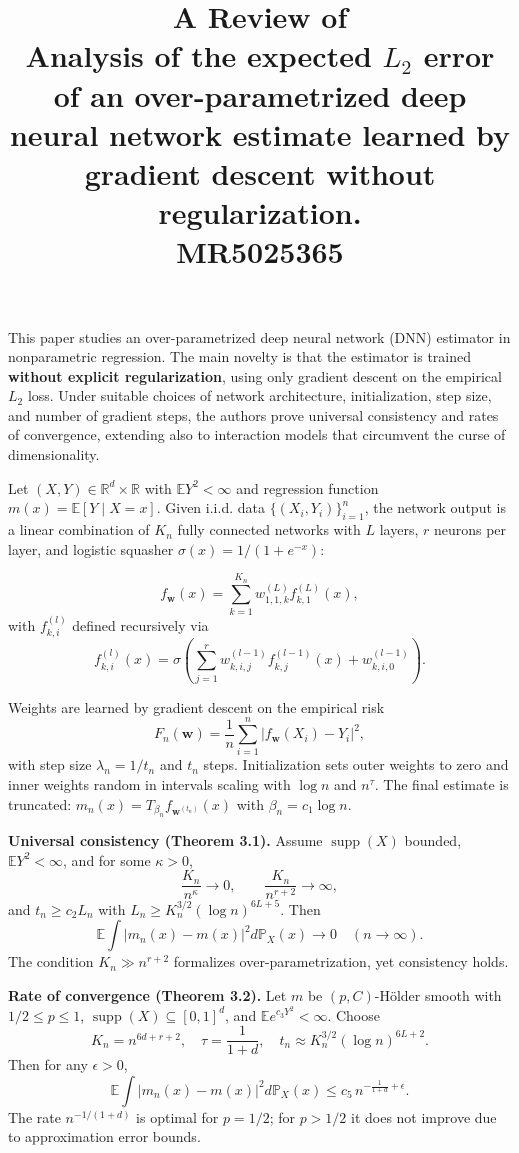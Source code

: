 \documentclass[11pt]{article}
\title{A Review of \\Analysis of the expected $L_{2}$ error of an over-parametrized deep neural network estimate learned by gradient descent without regularization.\\ MR5025365}
\begin{document}
	\maketitle	

\noindent This paper studies an over-parametrized deep neural network (DNN) estimator in nonparametric regression. The main novelty is that the estimator is trained \textbf{without explicit regularization}, using only gradient descent on the empirical $L_{2}$ loss. Under suitable choices of network architecture, initialization, step size, and number of gradient steps, the authors prove universal consistency and rates of convergence, extending also to interaction models that circumvent the curse of dimensionality.

Let $(X,Y)\in\mathbb{R}^d\times\mathbb{R}$ with $\mathbb{E}Y^2<\infty$ and regression function $m(x)=\mathbb{E}[Y\mid X=x]$. Given i.i.d. data $\{(X_i,Y_i)\}_{i=1}^n$, the network output is a linear combination of $K_n$ fully connected networks with $L$ layers, $r$ neurons per layer, and logistic squasher $\sigma(x)=1/(1+e^{-x})$:

$$
f_{\mathbf{w}}(x)=\sum_{k=1}^{K_n} w_{1,1,k}^{(L)} f_{k,1}^{(L)}(x),
$$
with $f_{k,i}^{(l)}$ defined recursively via
$$
f_{k,i}^{(l)}(x)=\sigma\!\left(\sum_{j=1}^r w_{k,i,j}^{(l-1)} f_{k,j}^{(l-1)}(x)+w_{k,i,0}^{(l-1)}\right).
$$

Weights are learned by gradient descent on the empirical risk
$$
F_n(\mathbf{w})=\frac1n\sum_{i=1}^n |f_{\mathbf{w}}(X_i)-Y_i|^2,
$$
with step size $\lambda_n=1/t_n$ and $t_n$ steps. Initialization sets outer weights to zero and inner weights random in intervals scaling with $\log n$ and $n^\tau$. The final estimate is truncated: $m_n(x)=T_{\beta_n}f_{\mathbf{w}^{(t_n)}}(x)$ with $\beta_n=c_1\log n$.

\medskip
\noindent \textbf{Universal consistency (Theorem 3.1).} 
Assume $\operatorname{supp}(X)$ bounded, $\mathbb{E}Y^2<\infty$, and for some $\kappa>0$,
$$
\frac{K_n}{n^\kappa}\to 0,\qquad \frac{K_n}{n^{r+2}}\to\infty,
$$
and $t_n\ge c_2 L_n$ with $L_n\ge K_n^{3/2}(\log n)^{6L+5}$. Then
$$
\mathbb{E}\int |m_n(x)-m(x)|^2 d\mathbb{P}_X(x)\to 0\quad (n\to\infty).
$$
The condition $K_n\gg n^{r+2}$ formalizes over-parametrization, yet consistency holds.

\medskip
\noindent \textbf{Rate of convergence (Theorem 3.2).} 
Let $m$ be $(p,C)$-Hölder smooth with $1/2\le p\le 1$, $\operatorname{supp}(X)\subseteq[0,1]^d$, and $\mathbb{E}e^{c_3 Y^2}<\infty$. Choose
$$
K_n=n^{6d+r+2},\quad \tau=\frac{1}{1+d},\quad t_n\approx K_n^{3/2}(\log n)^{6L+2}.
$$
Then for any $\epsilon>0$,
$$
\mathbb{E}\int |m_n(x)-m(x)|^2 d\mathbb{P}_X(x)\le c_5\, n^{-\frac{1}{1+d}+\epsilon}.
$$
The rate $n^{-1/(1+d)}$ is optimal for $p=1/2$; for $p>1/2$ it does not improve due to approximation error bounds.
\end{document}
